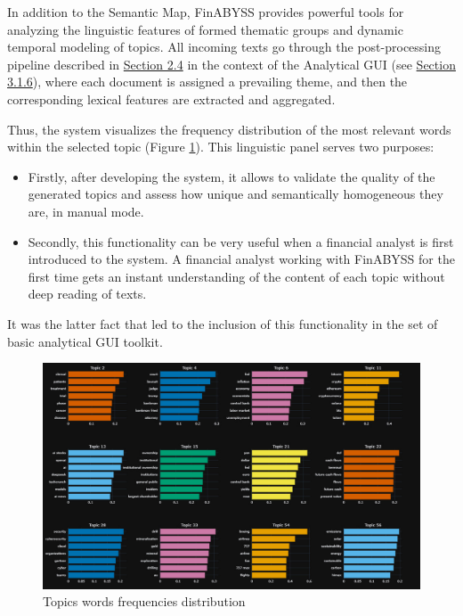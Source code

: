 In addition to the Semantic Map, FinABYSS provides powerful tools for analyzing the linguistic features
of formed thematic groups and dynamic temporal modeling of topics. All incoming texts go through
the post-processing pipeline described in \hyperref[sec:sys_dev]{Section 2.4} in the context of the Analytical GUI
(see \hyperref[sec:gui]{Section 3.1.6}), where each document is assigned a prevailing theme, and
then the corresponding lexical features are extracted and aggregated.

Thus, the system visualizes the frequency distribution of the most relevant words within the selected topic
(Figure \ref{fig:topics_words_freqs}). This linguistic panel serves two purposes:

\begin{itemize}
    \item Firstly, after developing the system, it allows to validate the quality of the generated topics
    and assess how unique and semantically homogeneous they are, in manual mode.
    \item Secondly, this functionality can be very useful when a financial analyst is first introduced
    to the system. A financial analyst working with FinABYSS for the first time gets an instant understanding
    of the content of each topic without deep reading of texts.
\end{itemize}

It was the latter fact that led to the inclusion of this functionality in the set of basic analytical GUI toolkit.

\begin{figure}[H]
    \centering
    \includegraphics[width=1\linewidth]{img/topics_words_freqs.png}
    \caption{Topics words frequencies distribution}
    \label{fig:topics_words_freqs}
\end{figure}

